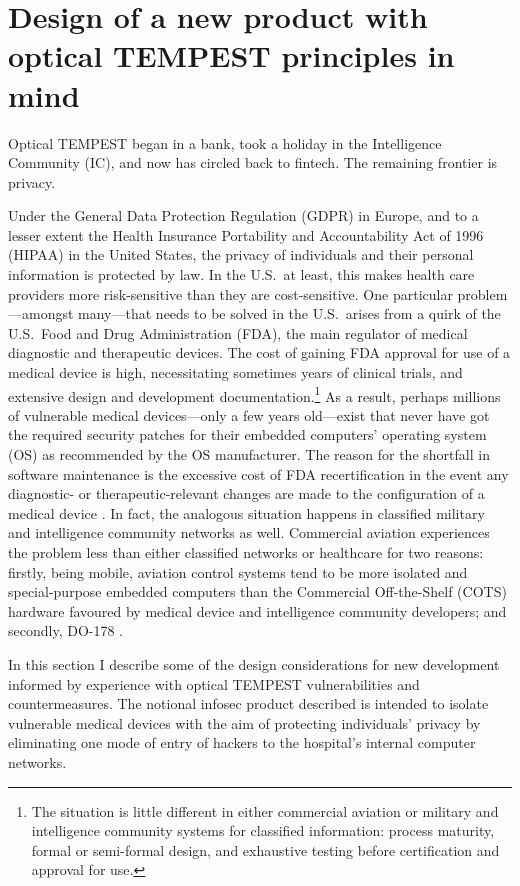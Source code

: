 \documentclass[conference]{IEEEtran}
\begin{document}
\section{Design of a new product with optical TEMPEST principles in mind}

Optical TEMPEST began in a bank, took a holiday in the Intelligence Community
(IC), and now has circled back to fintech. The remaining frontier is privacy.

Under the General Data Protection Regulation (GDPR) in Europe, and to a
lesser extent the Health Insurance Portability and Accountability Act of 1996
(HIPAA) in the United States, the privacy of individuals and their personal
information is protected by law. In the U.S.\ at least, this makes health
care providers more risk-sensitive than they are cost-sensitive. One
particular problem---amongst many---that needs to be solved in the U.S.\
arises from a quirk of the U.S.\ Food and Drug Administration (FDA), the main
regulator of medical diagnostic and therapeutic devices. The cost of gaining
FDA approval for use of a medical device is high, necessitating sometimes
years of clinical trials, and extensive design and development
documentation.\footnote{The situation is little different in either
commercial aviation or military and intelligence community systems for
classified information: process maturity, formal or semi-formal design, and
exhaustive testing before certification and approval for use.} As a result,
perhaps millions of vulnerable medical devices---only a few years old---exist
that never have got the required security patches for their embedded
computers' operating system (OS) as recommended by the OS manufacturer. The
reason for the shortfall in software maintenance is the excessive cost of FDA
recertification in the event any diagnostic- or therapeutic-relevant changes
are made to the configuration of a medical device \cite{Talbot2012}. In fact,
the analogous situation happens in classified military and intelligence
community networks as well. Commercial aviation experiences the problem less
than either classified networks or healthcare for two reasons: firstly, being
mobile, aviation control systems tend to be more isolated and special-purpose
embedded computers than the Commercial Off-the-Shelf (COTS) hardware favoured
by medical device and intelligence community developers; and secondly, DO-178
\cite{DO-178C}.

In this section I describe some of the design considerations for new
development informed by experience with optical TEMPEST vulnerabilities and
countermeasures. The notional infosec product described is intended to
isolate vulnerable medical devices with the aim of protecting individuals'
privacy by eliminating one mode of entry of hackers to the hospital's
internal computer networks.
\end{document}
